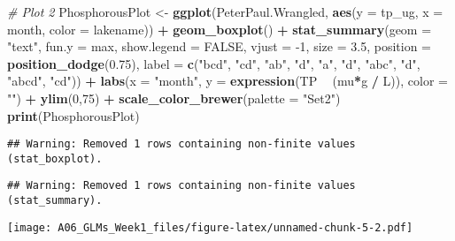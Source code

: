 \documentclass[]{article}
\newenvironment{Shaded}{\begin{snugshade}}{\end{snugshade}}
\newcommand{\CommentTok}[1]{\textcolor[rgb]{0.56,0.35,0.01}{\textit{#1}}}
\newcommand{\DataTypeTok}[1]{\textcolor[rgb]{0.13,0.29,0.53}{#1}}
\newcommand{\DecValTok}[1]{\textcolor[rgb]{0.00,0.00,0.81}{#1}}
\newcommand{\FloatTok}[1]{\textcolor[rgb]{0.00,0.00,0.81}{#1}}
\newcommand{\KeywordTok}[1]{\textcolor[rgb]{0.13,0.29,0.53}{\textbf{#1}}}
\newcommand{\NormalTok}[1]{#1}
\newcommand{\OperatorTok}[1]{\textcolor[rgb]{0.81,0.36,0.00}{\textbf{#1}}}
\newcommand{\OtherTok}[1]{\textcolor[rgb]{0.56,0.35,0.01}{#1}}
\newcommand{\StringTok}[1]{\textcolor[rgb]{0.31,0.60,0.02}{#1}}
\begin{document}
\begin{Shaded}
\begin{Highlighting}[]
\CommentTok{# Plot 2}
\NormalTok{PhosphorousPlot <-}\StringTok{ }\KeywordTok{ggplot}\NormalTok{(PeterPaul.Wrangled,}
                          \KeywordTok{aes}\NormalTok{(}\DataTypeTok{y =}\NormalTok{ tp_ug, }\DataTypeTok{x =}\NormalTok{ month, }
                              \DataTypeTok{color =}\NormalTok{ lakename)) }\OperatorTok{+}
\StringTok{  }\KeywordTok{geom_boxplot}\NormalTok{() }\OperatorTok{+}
\StringTok{   }\KeywordTok{stat_summary}\NormalTok{(}\DataTypeTok{geom =} \StringTok{"text"}\NormalTok{, }\DataTypeTok{fun.y =}\NormalTok{ max, }
                \DataTypeTok{show.legend =} \OtherTok{FALSE}\NormalTok{, }\DataTypeTok{vjust =} \DecValTok{-1}\NormalTok{, }
                \DataTypeTok{size =} \FloatTok{3.5}\NormalTok{, }\DataTypeTok{position =} \KeywordTok{position_dodge}\NormalTok{(}\FloatTok{0.75}\NormalTok{),}
               \DataTypeTok{label =} \KeywordTok{c}\NormalTok{(}\StringTok{"bcd"}\NormalTok{, }\StringTok{"cd"}\NormalTok{, }\StringTok{"ab"}\NormalTok{, }\StringTok{"d"}\NormalTok{, }\StringTok{"a"}\NormalTok{, }\StringTok{"d"}\NormalTok{, }\StringTok{"abc"}\NormalTok{, }\StringTok{"d"}\NormalTok{, }\StringTok{"abcd"}\NormalTok{, }\StringTok{"cd"}\NormalTok{)) }\OperatorTok{+}
\StringTok{  }\KeywordTok{labs}\NormalTok{(}\DataTypeTok{x =} \StringTok{"month"}\NormalTok{, }\DataTypeTok{y =} \KeywordTok{expression}\NormalTok{(TP }\OperatorTok{~}\StringTok{ }\NormalTok{(mu}\OperatorTok{*}\NormalTok{g }\OperatorTok{/}\StringTok{ }\NormalTok{L)),}
       \DataTypeTok{color =} \StringTok{""}\NormalTok{) }\OperatorTok{+}
\StringTok{   }\KeywordTok{ylim}\NormalTok{(}\DecValTok{0}\NormalTok{,}\DecValTok{75}\NormalTok{) }\OperatorTok{+}
\StringTok{  }\KeywordTok{scale_color_brewer}\NormalTok{(}\DataTypeTok{palette =} \StringTok{"Set2"}\NormalTok{) }
\KeywordTok{print}\NormalTok{(PhosphorousPlot)}
\end{Highlighting}
\end{Shaded}

\begin{verbatim}
## Warning: Removed 1 rows containing non-finite values (stat_boxplot).
\end{verbatim}

\begin{verbatim}
## Warning: Removed 1 rows containing non-finite values (stat_summary).
\end{verbatim}

\texttt{[image: A06\_GLMs\_Week1\_files/figure-latex/unnamed-chunk-5-2.pdf]}
\end{document}
